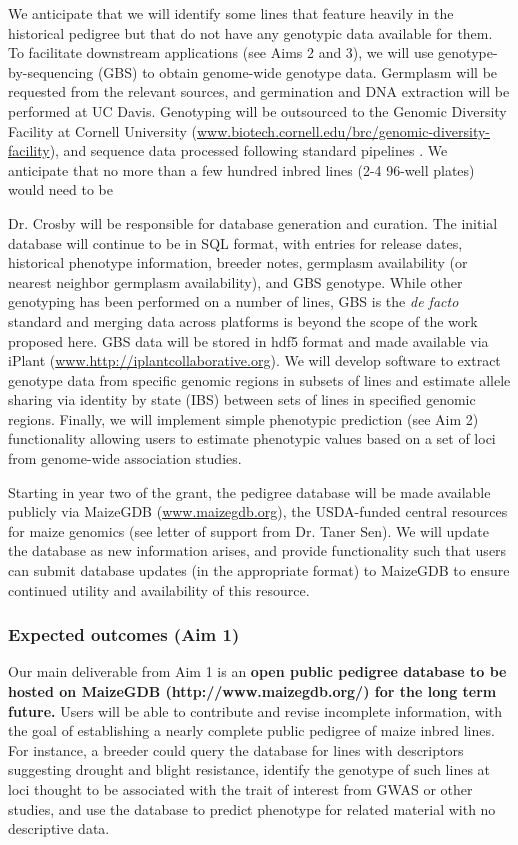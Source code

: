 \documentclass[12pt]{article}
\begin{document}
We anticipate that we will identify some lines that feature heavily in the historical pedigree but that do not have any genotypic data available for them. 
To facilitate downstream applications (see Aims 2 and 3), we will use genotype-by-sequencing (GBS) \citep{Elshire:2011ha} to obtain genome-wide genotype data.
Germplasm will be requested from the relevant sources, and germination and DNA extraction will be performed at UC Davis.  
Genotyping will be outsourced to the Genomic Diversity Facility at Cornell University (\small{\url{www.biotech.cornell.edu/brc/genomic-diversity-facility}}), and sequence data processed following standard pipelines \citep{Glaubitz:2014eu}.
We anticipate that no more than a few hundred inbred lines (2-4 96-well plates) would need to be 

Dr. Crosby will be responsible for database generation and curation.
The initial database will continue to be in SQL format, with entries for release dates, historical phenotype information, breeder notes, germplasm availability (or nearest neighbor germplasm availability), and GBS genotype.  
While other genotyping has been performed on a number of lines, GBS is the \emph{de facto} standard \citep{romay2013comprehensive} and merging data across platforms is beyond the scope of the work proposed here. 
GBS data will be stored in hdf5 format and made available via iPlant (\url{www.http://iplantcollaborative.org}).
We will develop software to extract genotype data from specific genomic regions in subsets of lines and estimate allele sharing via identity by state (IBS) between sets of lines in specified genomic regions.
Finally, we will implement simple phenotypic prediction (see Aim 2) functionality allowing users to estimate phenotypic values based on a set of loci from genome-wide association studies.

Starting in year two of the grant, the pedigree database will be made available publicly via MaizeGDB (\url{www.maizegdb.org}), the USDA-funded central resources for maize genomics (see letter of support from Dr. Taner Sen).
We will update the database as new information arises, and provide functionality such that users can submit database updates (in the appropriate format) to MaizeGDB to ensure continued utility and availability of this resource.

\subsubsection*{Expected outcomes (Aim 1)}
Our main deliverable from Aim 1 is an \textbf{open public pedigree database to be hosted on MaizeGDB (http://www.maizegdb.org/) for the long term future.} 
Users will be able to contribute and revise incomplete information, with the goal of establishing a nearly complete public pedigree of maize inbred lines.   
For instance, a breeder could query the database for lines with descriptors suggesting drought and blight resistance, identify the genotype of such lines at loci thought to be associated with the trait of interest from GWAS or other studies, and use the database to predict phenotype for related material with no descriptive data.
\end{document}
